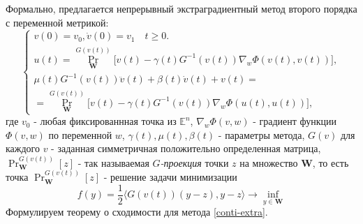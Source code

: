 Формально, предлагается непрерывный экстраградиентный метод второго порядка с переменной метрикой:
\begin{equation}
\label{conti-extra}
\left\{\begin{array}{l}
v(0)=v_0,\dot{v}(0)=v_1\quad t\geqslant 0.\\
u(t)=\operatorname{Pr}^{G(v(t))}_{\mathbf{W}}\big[ v(t)-\gamma(t)G^{-1}(v(t))\nabla_w\Phi(v(t),v(t))\big],\\
\mu(t)G^{-1}(v(t))\ddot{v}(t)+\beta(t)\dot{v}(t)+v(t)=\\
=\operatorname{Pr}^{G(v(t))}_{\mathbf{W}}\big[v(t)-\gamma(t)G^{-1}(v(t))\nabla_w\Phi(u(t),u(t)) \big],
\end{array}
\right.
\end{equation}
где $v_0$ - любая фиксированнная точка из $\mathbb{E}^n$, $\nabla_w\Phi(v,w)$ - градиент функции $\Phi(v,w)$ по переменной $w$, $\gamma(t),\mu(t),\beta(t)$ - параметры метода, $G(v)$ для каждого $v$ - заданная симметричная положительно определенная матрица, $\operatorname{Pr}^{G(v(t))}_{\mathbf{W}}[z]$ - так называемая \textit{$G$-проекция} точки $z$ на множество $\mathbf{W}$, то есть точка $\operatorname{Pr}^{G(v(t))}_{\mathbf{W}}[z]$ - решение задачи минимизации
\begin{equation*}
f(y)=\frac{1}{2}\langle G(v(t))(y-z),y-z \rangle \to\inf_{y\in\mathbf{W}}
\end{equation*}
Формулируем теорему о сходимости для метода \eqref{conti-extra}.
